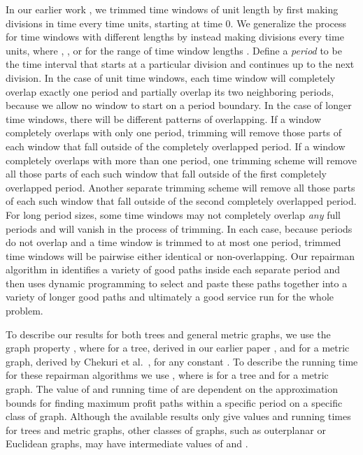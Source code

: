\documentclass[11pt]{article}
\begin{document}
In our earlier work \cite{Frederickson6, Frederickson5}, we trimmed time windows of unit length by first making divisions in time every  time units, starting at time 0.  We generalize the process for time windows with different lengths by instead making divisions every  time units, where , , or  for the range of time window lengths .
Define a {\em period} to be the time interval that starts at a particular division and continues up to the next division.  In the case of unit time windows, each time window will completely overlap exactly one period and partially overlap its two neighboring periods, because we allow no window to start on a period boundary.  In the case of longer time windows, there will be different patterns of overlapping.  If a window completely overlaps with only one period, trimming will remove those parts of each window that fall outside of the completely overlapped period.  If a window completely overlaps with more than one period, one trimming scheme will remove all those parts of each such window that fall outside of the first completely overlapped period.  Another separate trimming scheme will remove all those parts of each such window that fall outside of the second completely overlapped period.  For long period sizes, some time windows may not completely overlap {\em any} full periods and will vanish in the process of trimming.  In each case, because periods do not overlap and a time window is trimmed to at most one period, trimmed time windows will be pairwise either identical or non-overlapping.  Our repairman algorithm in \cite{Frederickson6} identifies a variety of good paths inside each separate period and then uses dynamic programming to select and paste these paths together into a variety of longer good paths and ultimately a good service run for the whole problem.

To describe our results for both trees and general metric graphs, we use the graph property , where  for a tree, derived in our earlier paper \cite{Frederickson6}, and  for a metric graph, derived by Chekuri et al.~\cite{Chekuri2}, for any constant .  To describe the running time for these repairman algorithms we use , where  is  for a tree and  for a metric graph.  The value of  and running time of  are dependent on the approximation bounds for finding maximum profit paths within a specific period on a specific class of graph.  Although the available results only give  values and  running times for trees and metric graphs, other classes of graphs, such as outerplanar or Euclidean graphs, may have intermediate values of  and .  
\end{document}
